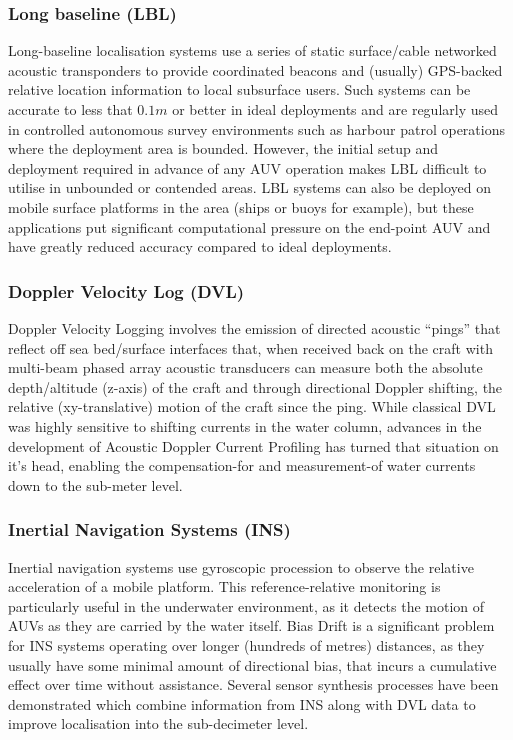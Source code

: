 \subsubsection{Long baseline (LBL)}
Long-baseline localisation systems use a series of static surface/cable networked acoustic transponders to provide coordinated beacons and (usually) GPS-backed relative location information to local subsurface users. 
Such systems can be accurate to less that $0.1m$ or better in ideal deployments and are regularly used in controlled autonomous survey environments such as harbour patrol operations where the deployment area is bounded. 
However, the initial setup and deployment required in advance of any AUV operation makes LBL difficult to utilise in unbounded or contended areas.
LBL systems can also be deployed on mobile surface platforms in the area (ships or buoys for example), but these applications put significant computational pressure on the end-point AUV and have greatly reduced accuracy compared to ideal deployments\cite{Matos1999}.
\subsubsection{Doppler Velocity Log (DVL)}
Doppler Velocity Logging involves the emission of directed acoustic ``pings'' that reflect off sea bed/surface interfaces that, when received back on the craft with multi-beam phased array acoustic transducers can measure both the absolute depth/altitude (z-axis) of the craft and through directional Doppler shifting, the relative (xy-translative) motion of the craft since the ping.
While classical DVL was highly sensitive to shifting currents in the water column, advances in the development of Acoustic Doppler Current Profiling has turned that situation on it's head, enabling the compensation-for and measurement-of water currents down to the sub-meter level\cite{Snyder2010}.
\subsubsection{Inertial Navigation Systems (INS)}
Inertial navigation systems use gyroscopic procession to observe the relative acceleration of a mobile platform.
This reference-relative monitoring is particularly useful in the underwater environment, as it detects the motion of AUVs as they are carried by the water itself.
Bias Drift is a significant problem for INS systems operating over longer (hundreds of metres) distances, as they usually have some minimal amount of directional bias, that incurs a cumulative effect over time without assistance.
Several sensor synthesis processes have been demonstrated which combine information from INS along with DVL data to improve localisation into the sub-decimeter level\cite{Jalving2003}\cite{Liu2014}.
